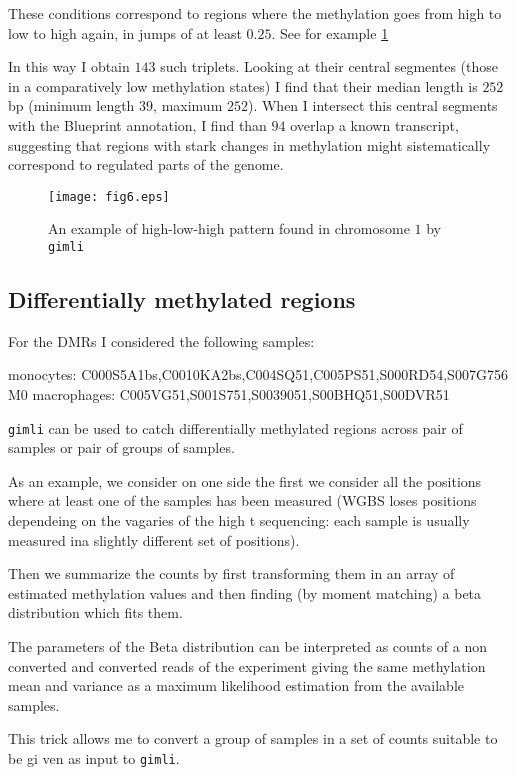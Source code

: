 \documentclass[12pt]{amsart}
\newcommand{\gimli}{\texttt{gimli}}
\begin{document}
These conditions correspond to regions where the methylation goes from high to low to high again,
in jumps of at least $0.25$.
See for example \ref{fig6} 

In this way I obtain $143$ such triplets. Looking at their central segmentes
(those in a comparatively low methylation states) I find that their median length is
$252$bp (minimum length $39$, maximum $252$). When I intersect this central segments with the Blueprint
annotation, I find than $94$ overlap a known transcript, suggesting that regions with stark 
changes in methylation
might sistematically correspond to regulated parts of the genome.

\begin{figure}\label{fig6}
\texttt{[image: fig6.eps]}
\caption{An example of high-low-high pattern found in chromosome $1$ by \gimli{}}
\end{figure}

\subsection{Differentially methylated regions}

For the DMRs I considered the following samples:


monocytes: C000S5A1bs,C0010KA2bs,C004SQ51,C005PS51,S000RD54,S007G756
M0 macrophages: C005VG51,S001S751,S0039051,S00BHQ51,S00DVR51

\gimli{} can be used to catch differentially methylated regions across pair of samples
or pair of groups of samples.

As an example, we consider on one side the 
first we consider all the positions where at least one of the samples has been measured
(WGBS loses positions dependeing on the vagaries of the high t sequencing: each sample
is usually measured ina slightly different set of positions).

Then we summarize the counts by first transforming them in an array of estimated methylation
values and then finding (by moment matching) a beta distribution which fits them.

The parameters of the Beta distribution can be interpreted as counts of 
a non converted and converted reads of the experiment giving the same methylation mean 
and variance as a maximum likelihood estimation from the available samples.

This trick allows me to convert a group of samples in a set of counts suitable to be gi
ven as input to \gimli{}.
\end{document}
